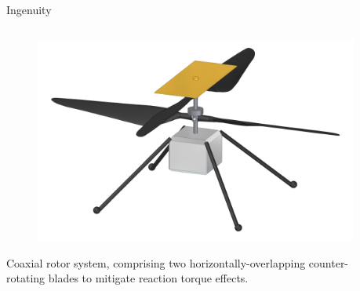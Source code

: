 \begin{frame}{Ingenuity}
\begin{columns}
\begin{column}{0.5\textwidth}
    \begin{figure}[H]
        \centering
        \includegraphics[width=0.7\columnwidth]{figures/ingenuity_render.png}
        \label{fig:ingenuity_render}
    \end{figure}
    Coaxial rotor system, comprising two horizontally-overlapping counter-rotating blades to mitigate reaction torque effects.
\end{column}
\begin{column}{0.6\textwidth}
    \begin{table}[H]
        \centering
\end{table}
\end{column}
\end{columns}
\end{frame}
